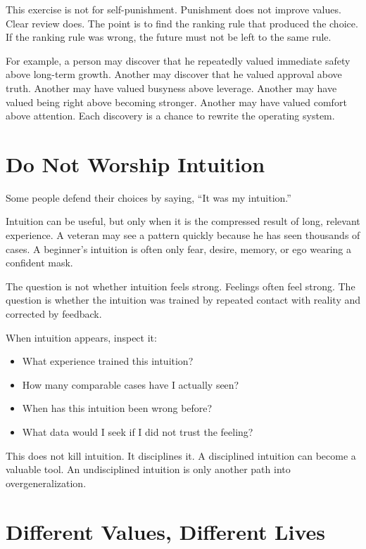 This exercise is not for self-punishment. Punishment does not improve values. Clear review does. The point is to find the ranking rule that produced the choice. If the ranking rule was wrong, the future must not be left to the same rule.

For example, a person may discover that he repeatedly valued immediate safety above long-term growth. Another may discover that he valued approval above truth. Another may have valued busyness above leverage. Another may have valued being right above becoming stronger. Another may have valued comfort above attention. Each discovery is a chance to rewrite the operating system.

\section*{Do Not Worship Intuition}

Some people defend their choices by saying, ``It was my intuition.''

Intuition can be useful, but only when it is the compressed result of long, relevant experience. A veteran may see a pattern quickly because he has seen thousands of cases. A beginner's intuition is often only fear, desire, memory, or ego wearing a confident mask.

The question is not whether intuition feels strong. Feelings often feel strong. The question is whether the intuition was trained by repeated contact with reality and corrected by feedback.

When intuition appears, inspect it:

\begin{itemize}
\item What experience trained this intuition?
\item How many comparable cases have I actually seen?
\item When has this intuition been wrong before?
\item What data would I seek if I did not trust the feeling?
\end{itemize}

This does not kill intuition. It disciplines it. A disciplined intuition can become a valuable tool. An undisciplined intuition is only another path into overgeneralization.

\section*{Different Values, Different Lives}

